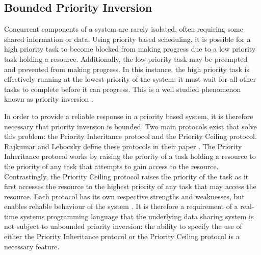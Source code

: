 \subsection{Bounded Priority Inversion}
Concurrent components of a system are rarely isolated,
often requiring some shared information or data.
Using priority based scheduling, it is possible for a high priority
task to become blocked from making progress due to a low priority task holding
a resource. Additionally, the low priority task may be preempted and prevented
from making progress. In this instance, the high priority task is effectively
running at the lowest priority of the system: it must wait for all other
tasks to complete before it can progress. This is a well studied phenomenon
known as priority inversion \cite{real-time-systems}.  
\par\bigskip\noindent
In
order to provide a reliable response in a priority based system, it is
therefore necessary that priority inversion is bounded.  Two main protocols
exist that solve this problem: the Priority Inheritance protocol and the
Priority Ceiling protocol. Rajkumar and Lehoczky define these protocols in their
paper \cite{57058}. The Priority Inheritance
protocol works by raising the priority of a task holding a resource to the
priority of any task that attempts to gain access to the resource.
Contrastingly, the Priority Ceiling protocol raises the priority of the task as
it first accesses the resource to the highest priority of any task that may
access the resource.  Each protocol has its own respective strengths and
weaknesses, but enables reliable behaviour of the system \cite{mall2009real}.
It is therefore a requirement of a real-time systems programming language that
the underlying data sharing system is not subject to unbounded priority
inversion: the ability to specify the use of either the Priority Inheritance
protocol or the Priority Ceiling protocol is a necessary feature.  

